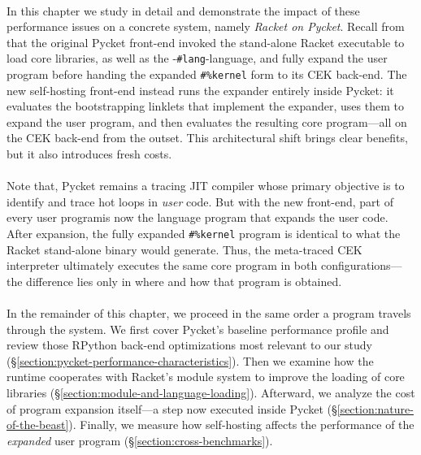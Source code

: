 	\paragraph{}%
	 	In this chapter we study in detail and demonstrate the impact of these performance issues on a concrete system, namely \emph{Racket on Pycket}. Recall from  that the original Pycket front-end invoked the stand-alone Racket executable to load core libraries, as well as the -\verb|#lang|-language, and fully expand the user program before handing the expanded \verb|#%kernel| form to its CEK back-end. The new self-hosting front-end instead runs the expander entirely inside Pycket: it evaluates the bootstrapping linklets that implement the expander, uses them to expand the user program, and then evaluates the resulting core program—all on the CEK back-end from the outset. This architectural shift brings clear benefits, but it also introduces fresh costs.

	\paragraph{}%
		Note that, Pycket remains a tracing JIT compiler whose primary objective is to identify and trace hot loops in \emph{user} code. But with the new front-end, part of every \smartQL user program\smartQR is now the language program that expands the user code. After expansion, the fully expanded \verb|#%kernel| program is identical to what the Racket stand-alone binary would generate. Thus, the meta-traced CEK interpreter ultimately executes the same core program in both configurations—the difference lies only in where and how that program is obtained.

	\paragraph{}%
		In the remainder of this chapter, we proceed in the same order a program travels through the system. We first cover Pycket's baseline performance profile and review those RPython back-end optimizations most relevant to our study (\S\ref{section:pycket-performance-characteristics}). Then we examine how the runtime cooperates with Racket's module system to improve the loading of core libraries (\S\ref{section:module-and-language-loading}). Afterward, we analyze the cost of program expansion itself—a step now executed inside Pycket (\S\ref{section:nature-of-the-beast}). Finally, we measure how self-hosting affects the performance of the \emph{expanded} user program (\S\ref{section:cross-benchmarks}).

